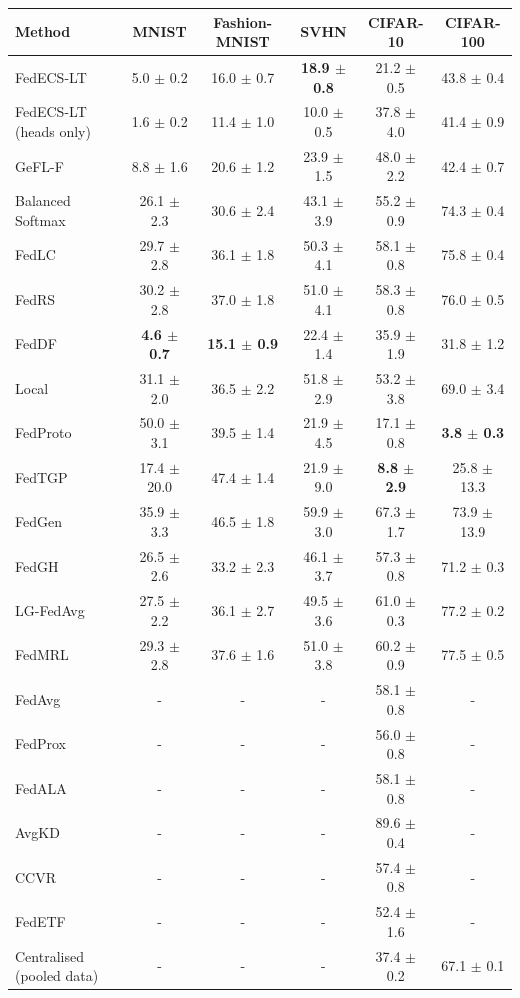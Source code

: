 \begin{tabular}{lccccc}
\toprule
Method & MNIST & Fashion-MNIST & SVHN & CIFAR-10 & CIFAR-100\\
\midrule
FedECS-LT & 5.0 $\pm$ 0.2 & 16.0 $\pm$ 0.7 & \textbf{18.9 $\pm$ 0.8} & 21.2 $\pm$ 0.5 & 43.8 $\pm$ 0.4\\
FedECS-LT (heads only) & 1.6 $\pm$ 0.2 & 11.4 $\pm$ 1.0 & 10.0 $\pm$ 0.5 & 37.8 $\pm$ 4.0 & 41.4 $\pm$ 0.9\\
GeFL-F & 8.8 $\pm$ 1.6 & 20.6 $\pm$ 1.2 & 23.9 $\pm$ 1.5 & 48.0 $\pm$ 2.2 & 42.4 $\pm$ 0.7\\
Balanced Softmax & 26.1 $\pm$ 2.3 & 30.6 $\pm$ 2.4 & 43.1 $\pm$ 3.9 & 55.2 $\pm$ 0.9 & 74.3 $\pm$ 0.4\\
FedLC & 29.7 $\pm$ 2.8 & 36.1 $\pm$ 1.8 & 50.3 $\pm$ 4.1 & 58.1 $\pm$ 0.8 & 75.8 $\pm$ 0.4\\
FedRS & 30.2 $\pm$ 2.8 & 37.0 $\pm$ 1.8 & 51.0 $\pm$ 4.1 & 58.3 $\pm$ 0.8 & 76.0 $\pm$ 0.5\\
FedDF & \textbf{4.6 $\pm$ 0.7} & \textbf{15.1 $\pm$ 0.9} & 22.4 $\pm$ 1.4 & 35.9 $\pm$ 1.9 & 31.8 $\pm$ 1.2\\
Local & 31.1 $\pm$ 2.0 & 36.5 $\pm$ 2.2 & 51.8 $\pm$ 2.9 & 53.2 $\pm$ 3.8 & 69.0 $\pm$ 3.4\\
FedProto & 50.0 $\pm$ 3.1 & 39.5 $\pm$ 1.4 & 21.9 $\pm$ 4.5 & 17.1 $\pm$ 0.8 & \textbf{3.8 $\pm$ 0.3}\\
FedTGP & 17.4 $\pm$ 20.0 & 47.4 $\pm$ 1.4 & 21.9 $\pm$ 9.0 & \textbf{8.8 $\pm$ 2.9} & 25.8 $\pm$ 13.3\\
FedGen & 35.9 $\pm$ 3.3 & 46.5 $\pm$ 1.8 & 59.9 $\pm$ 3.0 & 67.3 $\pm$ 1.7 & 73.9 $\pm$ 13.9\\
FedGH & 26.5 $\pm$ 2.6 & 33.2 $\pm$ 2.3 & 46.1 $\pm$ 3.7 & 57.3 $\pm$ 0.8 & 71.2 $\pm$ 0.3\\
LG-FedAvg & 27.5 $\pm$ 2.2 & 36.1 $\pm$ 2.7 & 49.5 $\pm$ 3.6 & 61.0 $\pm$ 0.3 & 77.2 $\pm$ 0.2\\
FedMRL & 29.3 $\pm$ 2.8 & 37.6 $\pm$ 1.6 & 51.0 $\pm$ 3.8 & 60.2 $\pm$ 0.9 & 77.5 $\pm$ 0.5\\
FedAvg & - & - & - & 58.1 $\pm$ 0.8 & -\\
FedProx & - & - & - & 56.0 $\pm$ 0.8 & -\\
FedALA & - & - & - & 58.1 $\pm$ 0.8 & -\\
AvgKD & - & - & - & 89.6 $\pm$ 0.4 & -\\
CCVR & - & - & - & 57.4 $\pm$ 0.8 & -\\
FedETF & - & - & - & 52.4 $\pm$ 1.6 & -\\
Centralised (pooled data) & - & - & - & 37.4 $\pm$ 0.2 & 67.1 $\pm$ 0.1\\
\bottomrule
\end{tabular}
